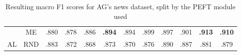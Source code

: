 \begin{table}[htbp]
\begin{subtable}{\linewidth}
\begin{tabular}{c|c|cccccccccc}
 & ME & .880 & .878 & .886 & \textbf{.894} & .894 & .899 & .897 & .901 & \textbf{.913} & \textbf{.910}\\

\multirow{-3}{*}{\raggedright\arraybackslash AL} & RND & .883 & .872 & .868 & .873 & .870 & .876 & .890 & .887 & .881 & .879\\
\bottomrule
\end{tabular}
\end{subtable}
\caption{Resulting macro F1 scores for AG's news dataset, split by the PEFT module used}
\label{tab:results_short_agnews_10}
\end{table}
